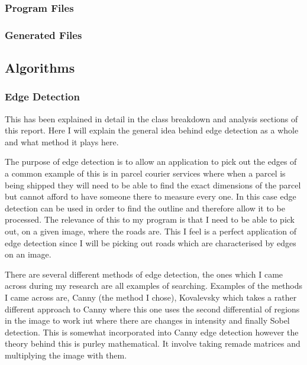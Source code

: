 \begin{FlushLeft}
\begin{enumerate}
    \subsubsection{Program Files}
    \bk
    \subsubsection{Generated Files}
    \bk

    \BK

    \subsection{Algorithms}

    \subsubsection{Edge Detection}
    This has been explained in detail in the class breakdown and analysis sections of this report. Here I will explain the general idea behind edge detection as a whole and what method it plays here. \\ \bk

    The purpose of edge detection is to allow an application to pick out the edges of a common example of this is in parcel courier services where when a parcel is being shipped they will need to be able to find the exact dimensions of the parcel but cannot afford to have someone there to measure every one. In this case edge detection can be used in order to find the outline and therefore allow it to be processed. The relevance of this to my program is that I need to be able to pick out, on a given image, where the roads are. This I feel is a perfect application of edge detection since I will be picking out roads which are characterised by edges on an image. \\ \bk

    There are several different methods of edge detection, the ones which I came across during my research are all examples of searching. Examples of the methods I came across are, Canny (the method I chose), Kovalevsky which takes a rather different approach to Canny where this one uses the second differential of regions in the image to work iut where there are changes in intensity and finally Sobel detection. This is somewhat incorporated into Canny edge detection however the theory behind this is purley mathematical. It involve taking remade matrices and multiplying the image with them. \\ \bk


\end{enumerate}
\end{FlushLeft}
